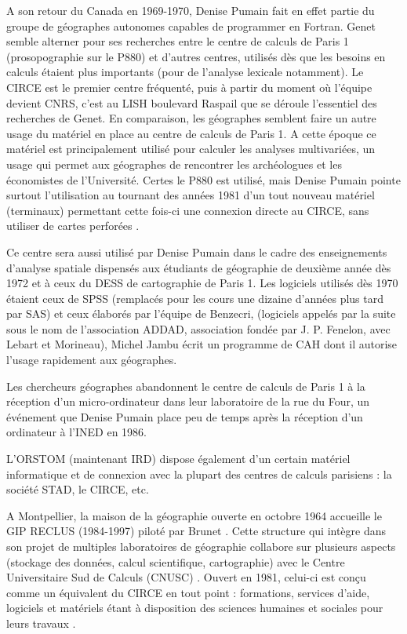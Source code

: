 A son retour du Canada en 1969-1970, Denise Pumain fait en effet partie du groupe de géographes autonomes capables de programmer en Fortran. Genet semble alterner pour ses recherches entre le centre de calculs de Paris 1 (prosopographie sur le P880) et d'autres centres, utilisés dès que les besoins en calculs étaient plus importants (pour de l'analyse lexicale notamment). Le  CIRCE est le premier centre fréquenté, puis à partir du moment où l'équipe devient CNRS, c'est au LISH boulevard Raspail que se déroule l'essentiel des recherches de Genet. En comparaison, les géographes semblent faire un autre usage du matériel en place au centre de calculs de Paris 1. A cette époque ce matériel est principalement utilisé pour calculer les analyses multivariées, un usage qui permet aux géographes de rencontrer les archéologues et les économistes de l'Université. Certes le P880 est utilisé, mais Denise Pumain pointe surtout l'utilisation au tournant des années 1981 d'un tout nouveau matériel (terminaux) permettant cette fois-ci une connexion directe au CIRCE, sans utiliser de cartes perforées .

Ce centre sera aussi utilisé par Denise Pumain dans le cadre des enseignements d'analyse spatiale dispensés aux étudiants de géographie de deuxième année dès 1972 et à ceux du DESS de cartographie de Paris 1. Les logiciels utilisés dès 1970 étaient ceux de SPSS (remplacés pour les cours une dizaine d'années plus tard par SAS) et ceux élaborés par l'équipe de Benzecri, (logiciels appelés par la suite sous le nom de l'association ADDAD, association fondée par J. P. Fenelon, avec Lebart et Morineau), Michel Jambu écrit un programme de CAH dont il autorise l'usage rapidement aux géographes.

Les chercheurs géographes abandonnent le centre de calculs de Paris 1 à la réception d'un micro-ordinateur dans leur laboratoire de la rue du Four, un événement que Denise Pumain place peu de temps après la réception d'un ordinateur à l'INED en 1986. 

L’ORSTOM (maintenant IRD) dispose également d’un certain matériel informatique et de connexion avec la plupart des centres de calculs parisiens : la société STAD, le CIRCE, etc. \autocite{Dejardin1992}

A Montpellier, la maison de la géographie ouverte en octobre 1964 accueille le GIP RECLUS (1984-1997) piloté par Brunet \autocite{Brunet1988}. Cette structure qui intègre dans son projet de multiples laboratoires de géographie collabore sur plusieurs aspects (stockage des données, calcul scientifique, cartographie) avec le Centre Universitaire Sud de Calculs (CNUSC) \autocite{Waniez2010}. Ouvert en 1981, celui-ci est conçu comme un équivalent du CIRCE en tout point : formations, services d’aide, logiciels et matériels étant à disposition des sciences humaines et sociales pour leurs travaux  .


